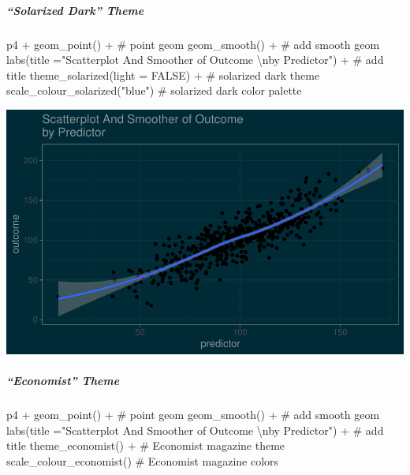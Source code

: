 \documentclass[12pt,]{article}
\newenvironment{Shaded}{}{}
\newcommand{\CharTok}[1]{\textcolor[rgb]{0.00,0.50,0.50}{#1}}
\newcommand{\CommentTok}[1]{\textcolor[rgb]{0.00,0.50,0.00}{#1}}
\newcommand{\DataTypeTok}[1]{#1}
\newcommand{\KeywordTok}[1]{\textcolor[rgb]{0.00,0.00,1.00}{#1}}
\newcommand{\NormalTok}[1]{#1}
\newcommand{\OperatorTok}[1]{#1}
\newcommand{\OtherTok}[1]{\textcolor[rgb]{1.00,0.25,0.00}{#1}}
\newcommand{\StringTok}[1]{\textcolor[rgb]{0.00,0.50,0.50}{#1}}
\let\oldsubparagraph\subparagraph
\renewcommand{\subparagraph}[1]{\oldsubparagraph{#1}\mbox{}}
\begin{document}
\hypertarget{solarized-dark-theme}{%
\subparagraph{``Solarized Dark'' Theme}\label{solarized-dark-theme}}

\begin{Shaded}
\begin{Highlighting}[]
\NormalTok{p4 }\OperatorTok{+}\StringTok{ }
\StringTok{  }\KeywordTok{geom_point}\NormalTok{() }\OperatorTok{+}\StringTok{ }\CommentTok{# point geom}
\StringTok{  }\KeywordTok{geom_smooth}\NormalTok{() }\OperatorTok{+}\StringTok{ }\CommentTok{# add smooth geom}
\StringTok{  }\KeywordTok{labs}\NormalTok{(}\DataTypeTok{title =}\StringTok{"Scatterplot And Smoother of Outcome }\CharTok{\textbackslash{}n}\StringTok{by Predictor"}\NormalTok{) }\OperatorTok{+}\StringTok{ }\CommentTok{# add title}
\StringTok{  }\KeywordTok{theme_solarized}\NormalTok{(}\DataTypeTok{light =} \OtherTok{FALSE}\NormalTok{) }\OperatorTok{+}\StringTok{ }\CommentTok{# solarized dark theme}
\StringTok{  }\KeywordTok{scale_colour_solarized}\NormalTok{(}\StringTok{"blue"}\NormalTok{) }\CommentTok{# solarized dark color palette}
\end{Highlighting}
\end{Shaded}

\includegraphics{introduction-to-ggplot2_files/figure-latex/unnamed-chunk-28-1.pdf}

\hypertarget{economist-theme}{%
\subparagraph{``Economist'' Theme}\label{economist-theme}}

\begin{Shaded}
\begin{Highlighting}[]
\NormalTok{p4 }\OperatorTok{+}\StringTok{ }
\StringTok{  }\KeywordTok{geom_point}\NormalTok{() }\OperatorTok{+}\StringTok{ }\CommentTok{# point geom}
\StringTok{  }\KeywordTok{geom_smooth}\NormalTok{() }\OperatorTok{+}\StringTok{ }\CommentTok{# add smooth geom}
\StringTok{  }\KeywordTok{labs}\NormalTok{(}\DataTypeTok{title =}\StringTok{"Scatterplot And Smoother of Outcome }\CharTok{\textbackslash{}n}\StringTok{by Predictor"}\NormalTok{) }\OperatorTok{+}\StringTok{ }\CommentTok{# add title}
\StringTok{  }\KeywordTok{theme_economist}\NormalTok{() }\OperatorTok{+}\StringTok{ }\CommentTok{# Economist magazine theme}
\StringTok{  }\KeywordTok{scale_colour_economist}\NormalTok{() }\CommentTok{# Economist magazine colors}
\end{Highlighting}
\end{Shaded}
\end{document}
